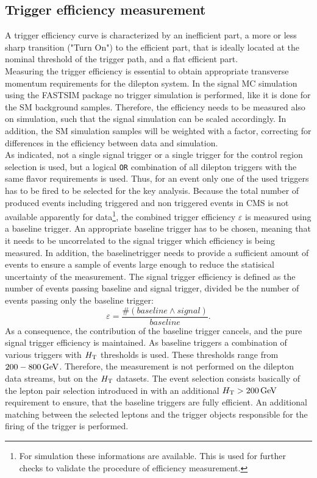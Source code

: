 \subsection{Trigger efficiency measurement}
A trigger efficiency curve is characterized by an inefficient part, a more or less sharp transition ("Turn On") to the efficient part, that is ideally located at the nominal threshold of the trigger path, and a flat efficient part.\\
Measuring the trigger efficiency is essential to obtain appropriate transverse momentum requirements for the dilepton system. In the signal MC simulation using the \textsc{FASTSIM} package no trigger simulation is performed, like it is done for the SM background samples. Therefore, the efficiency needs to be measured also on simulation, such that the signal simulation can be scaled accordingly. In addition, the SM simulation samples will be weighted with a factor, correcting for differences in the efficiency between data and simulation.\\
As indicated, not a single signal trigger or a single trigger for the control region selection is used, but a logical \texttt{OR} combination of all dilepton triggers with the same flavor requirements is used. Thus, for an event only one of the used triggers has to be fired to be selected for the key analysis. Because the total number of produced events including triggered and non triggered events in CMS is not available apparently for data\footnote{For simulation these informations are available. This is used for further checks to validate the procedure of efficiency measurement.}, the combined trigger efficiency $\varepsilon$ is measured using a baseline trigger. An appropriate baseline trigger has to be chosen, meaning that it needs to be uncorrelated to the signal trigger which efficiency is being measured. In addition, the baselinetrigger needs to provide a sufficient amount of events to ensure a sample of events large enough to reduce the statisical uncertainty of the measurement. The signal trigger efficiency is defined as the number of events passing baseline and signal trigger, divided be the number of events passing only the baseline trigger:
\begin{equation}
 \varepsilon=\frac{\#(baseline \wedge signal)}{baseline}.
\end{equation}
As a consequence, the contribution of the baseline trigger cancels, and the pure signal trigger efficiency is maintained. As baseline triggers a combination of various triggers with $H_{\mathrm{T}}$ thresholds is used. These thresholds range from $200-800\,\text{Ge\hspace{-.08em}V}$. Therefore, the measurement is not performed on the dilepton data streams, but on the $H_{\mathrm{T}}$ datasets. The event selection consists basically of the lepton pair selection introduced in  with an additional $H_{\mathrm{T}}>200\,\text{Ge\hspace{-.08em}V}$ requirement to ensure, that the baseline triggers are fully efficient. An additional matching between the selected leptons and the trigger objects responsible for the firing of the trigger is performed.\\
